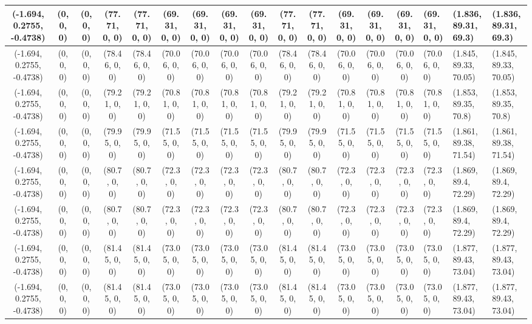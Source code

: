 \begin{tabular}{| c | c | c | c | c | c | c | c | c | c | c | c | c | c |}
	(-1.694, 0.2755, -0.4738) & (0, 0, 0) & (0, 0, 0) & (77.71, 0, 0) & (77.71, 0, 0) & (69.31, 0, 0) & (69.31, 0, 0) & (69.31, 0, 0) & (69.31, 0, 0) & (77.71, 0, 0) & (77.71, 0, 0) & (69.31, 0, 0) & (69.31, 0, 0) & (69.31, 0, 0) & (69.31, 0, 0) & (1.836, 89.31, 69.3) & (1.836, 89.31, 69.3) \\ \hline
	(-1.694, 0.2755, -0.4738) & (0, 0, 0) & (0, 0, 0) & (78.46, 0, 0) & (78.46, 0, 0) & (70.06, 0, 0) & (70.06, 0, 0) & (70.06, 0, 0) & (70.06, 0, 0) & (78.46, 0, 0) & (78.46, 0, 0) & (70.06, 0, 0) & (70.06, 0, 0) & (70.06, 0, 0) & (70.06, 0, 0) & (1.845, 89.33, 70.05) & (1.845, 89.33, 70.05) \\ \hline
	(-1.694, 0.2755, -0.4738) & (0, 0, 0) & (0, 0, 0) & (79.21, 0, 0) & (79.21, 0, 0) & (70.81, 0, 0) & (70.81, 0, 0) & (70.81, 0, 0) & (70.81, 0, 0) & (79.21, 0, 0) & (79.21, 0, 0) & (70.81, 0, 0) & (70.81, 0, 0) & (70.81, 0, 0) & (70.81, 0, 0) & (1.853, 89.35, 70.8) & (1.853, 89.35, 70.8) \\ \hline
	(-1.694, 0.2755, -0.4738) & (0, 0, 0) & (0, 0, 0) & (79.95, 0, 0) & (79.95, 0, 0) & (71.55, 0, 0) & (71.55, 0, 0) & (71.55, 0, 0) & (71.55, 0, 0) & (79.95, 0, 0) & (79.95, 0, 0) & (71.55, 0, 0) & (71.55, 0, 0) & (71.55, 0, 0) & (71.55, 0, 0) & (1.861, 89.38, 71.54) & (1.861, 89.38, 71.54) \\ \hline
	(-1.694, 0.2755, -0.4738) & (0, 0, 0) & (0, 0, 0) & (80.7, 0, 0) & (80.7, 0, 0) & (72.3, 0, 0) & (72.3, 0, 0) & (72.3, 0, 0) & (72.3, 0, 0) & (80.7, 0, 0) & (80.7, 0, 0) & (72.3, 0, 0) & (72.3, 0, 0) & (72.3, 0, 0) & (72.3, 0, 0) & (1.869, 89.4, 72.29) & (1.869, 89.4, 72.29) \\ \hline
	(-1.694, 0.2755, -0.4738) & (0, 0, 0) & (0, 0, 0) & (80.7, 0, 0) & (80.7, 0, 0) & (72.3, 0, 0) & (72.3, 0, 0) & (72.3, 0, 0) & (72.3, 0, 0) & (80.7, 0, 0) & (80.7, 0, 0) & (72.3, 0, 0) & (72.3, 0, 0) & (72.3, 0, 0) & (72.3, 0, 0) & (1.869, 89.4, 72.29) & (1.869, 89.4, 72.29) \\ \hline
	(-1.694, 0.2755, -0.4738) & (0, 0, 0) & (0, 0, 0) & (81.45, 0, 0) & (81.45, 0, 0) & (73.05, 0, 0) & (73.05, 0, 0) & (73.05, 0, 0) & (73.05, 0, 0) & (81.45, 0, 0) & (81.45, 0, 0) & (73.05, 0, 0) & (73.05, 0, 0) & (73.05, 0, 0) & (73.05, 0, 0) & (1.877, 89.43, 73.04) & (1.877, 89.43, 73.04) \\ \hline
	(-1.694, 0.2755, -0.4738) & (0, 0, 0) & (0, 0, 0) & (81.45, 0, 0) & (81.45, 0, 0) & (73.05, 0, 0) & (73.05, 0, 0) & (73.05, 0, 0) & (73.05, 0, 0) & (81.45, 0, 0) & (81.45, 0, 0) & (73.05, 0, 0) & (73.05, 0, 0) & (73.05, 0, 0) & (73.05, 0, 0) & (1.877, 89.43, 73.04) & (1.877, 89.43, 73.04) \\ \hline

\end{tabular}
